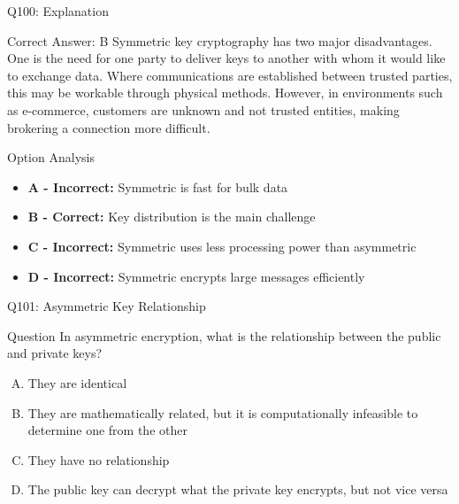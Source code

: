 \documentclass{beamer}
\begin{document}
	\begin{frame}{Q100: Explanation}
		\begin{block}{Correct Answer: B}
			Symmetric key cryptography has two major disadvantages. One is the need for one party to deliver keys to another with whom it would like to exchange data. Where communications are established between trusted parties, this may be workable through physical methods. However, in environments such as e-commerce, customers are unknown and not trusted entities, making brokering a connection more difficult.
		\end{block}
		\begin{block}{Option Analysis}
			\begin{itemize}
				\item \textbf{A - Incorrect:} Symmetric is fast for bulk data
				\item \textbf{B - Correct:} Key distribution is the main challenge
				\item \textbf{C - Incorrect:} Symmetric uses less processing power than asymmetric
				\item \textbf{D - Incorrect:} Symmetric encrypts large messages efficiently
			\end{itemize}
		\end{block}
	\end{frame}
	
	\begin{frame}{Q101: Asymmetric Key Relationship}
		\begin{block}{Question}
			In asymmetric encryption, what is the relationship between the public and private keys?
		\end{block}
		\begin{enumerate}[(A)]
			\item They are identical
			\item They are mathematically related, but it is computationally infeasible to determine one from the other
			\item They have no relationship
			\item The public key can decrypt what the private key encrypts, but not vice versa
		\end{enumerate}
	\end{frame}
	
\end{document}
